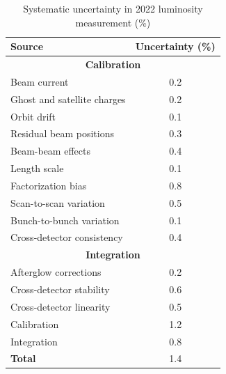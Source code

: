 \begin{table}[H]
  \centering
  \caption[Systematic uncertainty in 2022 luminosity measurement]{Systematic uncertainty in 2022 luminosity measurement (\%) \cite{pas_22}}
    \begin{tabular}{l|c}
        \textbf{Source} & \textbf{Uncertainty (\%)} \\
        \hline
        \multicolumn{2}{c}{\textbf{Calibration}} \\
        \hline
        Beam current & 0.2 \\
        Ghost and satellite charges & 0.2 \\
        Orbit drift & 0.1 \\
        Residual beam positions & 0.3 \\
        Beam-beam effects & 0.4 \\
        Length scale & 0.1 \\
        Factorization bias & 0.8 \\
        Scan-to-scan variation & 0.5 \\
        Bunch-to-bunch variation & 0.1 \\
        Cross-detector consistency & 0.4 \\
        \hline
        \multicolumn{2}{c}{\textbf{Integration}} \\
        \hline
        Afterglow corrections & 0.2 \\
        Cross-detector stability & 0.6 \\
        Cross-detector linearity & 0.5 \\
        \hline
        Calibration & 1.2 \\
        Integration & 0.8 \\
        \hline
        \textbf{Total} & 1.4 \\
    \end{tabular}
    \label{table:correction_uncertainties}
\end{table}


